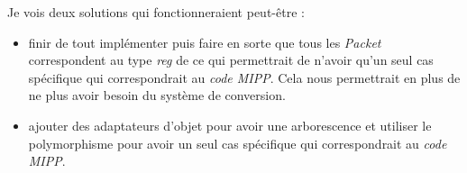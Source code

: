 Je vois deux solutions qui fonctionneraient peut-être :

\begin{itemize}
  \item finir de tout implémenter puis faire en sorte que tous les \emph{Packet}
  correspondent au type \emph{reg} de \MIPP ce qui permettrait de n'avoir qu'un seul cas
  spécifique qui correspondrait au \emph{code MIPP}. Cela nous permettrait en plus de ne
  plus avoir besoin du système de conversion.
  \item ajouter des adaptateurs d'objet pour avoir une arborescence et utiliser le
  polymorphisme pour avoir un seul cas spécifique qui correspondrait au \emph{code MIPP}.
\end{itemize}
